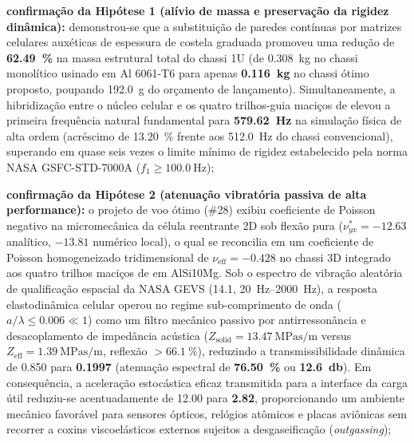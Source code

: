 \begin{alineas}
  \item \textbf{confirmação da Hipótese 1 (alívio de massa e preservação da rigidez dinâmica):} demonstrou-se que a substituição de paredes contínuas por matrizes celulares auxéticas de espessura de costela graduada promoveu uma redução de \textbf{\SI{62.49}{\percent}} na massa estrutural total do chassi 1U (de \SI{0.308}{\kilo\gram} no chassi monolítico usinado em Al 6061-T6 para apenas \textbf{\SI{0.116}{\kilo\gram}} no chassi ótimo proposto, poupando \SI{192.0}{\gram} do orçamento de lançamento). Simultaneamente, a hibridização entre o núcleo celular e os quatro trilhos-guia maciços de \rail{} elevou a primeira frequência natural fundamental para \textbf{\SI{579.62}{\hertz}} na simulação física de alta ordem (acréscimo de \SI{+13.20}{\percent} frente aos \SI{512.0}{\hertz} do chassi convencional), superando em quase seis vezes o limite mínimo de rigidez estabelecido pela norma NASA GSFC-STD-7000A ($f_1 \ge \SI{100.0}{\hertz}$);
  
  \item \textbf{confirmação da Hipótese 2 (atenuação vibratória passiva de alta performance):} o projeto de voo ótimo (\#28) exibiu coeficiente de Poisson negativo na micromecânica da célula reentrante 2D sob flexão pura ($\nu_{yx}^* = \num{-12.63}$ analítico, $\num{-13.81}$ numérico local), o qual se reconcilia em um coeficiente de Poisson homogeneizado tridimensional de $\nu_{\text{eff}} = \num{-0.428}$ no chassi 3D integrado aos quatro trilhos maciços de \rail{} em AlSi10Mg. Sob o espectro de vibração aleatória de qualificação espacial da NASA GEVS (\SI{14.1}{\Grms}, \SIrange{20}{2000}{\hertz}), a resposta elastodinâmica celular operou no regime sub-comprimento de onda ($a/\lambda \le \num{0.006} \ll 1$) como um filtro mecânico passivo por antirressonância e desacoplamento de impedância acústica ($Z_{\text{solid}} = \SI{13.47}{\mega\pascal\second\per\metre}$ versus $Z_{\text{eff}} = \SI{1.39}{\mega\pascal\second\per\metre}$, reflexão $> \SI{66.1}{\percent}$), reduzindo a transmissibilidade dinâmica de \num{0.850} para \textbf{\num{0.1997}} (atenuação espectral de \textbf{\SI{76.50}{\percent}} ou \textbf{\SI{12.6}{\decibel}}). Em consequência, a aceleração estocástica eficaz transmitida para a interface da carga útil reduziu-se acentuadamente de \SI{12.00}{\Grms} para \textbf{\SI{2.82}{\Grms}}, proporcionando um ambiente mecânico favorável para sensores ópticos, relógios atômicos e placas aviônicas sem recorrer a coxins viscoelásticos externos sujeitos a desgaseificação (\textit{outgassing});
  

\end{alineas}
